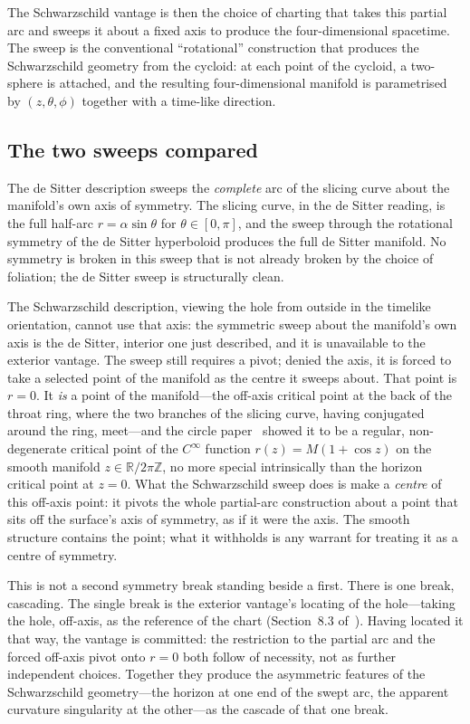\documentclass[11pt,a4paper]{article}
\theoremstyle{definition}
\begin{document}
The Schwarzschild vantage is then the choice of charting that takes this partial arc and sweeps it about a fixed axis to produce the four-dimensional spacetime. The sweep is the conventional ``rotational'' construction that produces the Schwarzschild geometry from the cycloid: at each point of the cycloid, a two-sphere is attached, and the resulting four-dimensional manifold is parametrised by $(z, \theta, \phi)$ together with a time-like direction.

\subsection{The two sweeps compared}\label{sec:two-sweeps}

The de Sitter description sweeps the \emph{complete} arc of the slicing curve about the manifold's own axis of symmetry. The slicing curve, in the de Sitter reading, is the full half-arc $r=\alpha\sin\theta$ for $\theta\in[0,\pi]$, and the sweep through the rotational symmetry of the de Sitter hyperboloid produces the full de Sitter manifold. No symmetry is broken in this sweep that is not already broken by the choice of foliation; the de Sitter sweep is structurally clean.

The Schwarzschild description, viewing the hole from outside in the timelike orientation, cannot use that axis: the symmetric sweep about the manifold's own axis is the de Sitter, interior one just described, and it is unavailable to the exterior vantage. The sweep still requires a pivot; denied the axis, it is forced to take a selected point of the manifold as the centre it sweeps about. That point is $r=0$. It \emph{is} a point of the manifold---the off-axis critical point at the back of the throat ring, where the two branches of the slicing curve, having conjugated around the ring, meet---and the circle paper~\cite{JanzenCircle} showed it to be a regular, non-degenerate critical point of the $C^{\infty}$ function $r(z)=M(1+\cos z)$ on the smooth manifold $z\in\mathbb{R}/2\pi\mathbb{Z}$, no more special intrinsically than the horizon critical point at $z=0$. What the Schwarzschild sweep does is make a \emph{centre} of this off-axis point: it pivots the whole partial-arc construction about a point that sits off the surface's axis of symmetry, as if it were the axis. The smooth structure contains the point; what it withholds is any warrant for treating it as a centre of symmetry.

This is not a second symmetry break standing beside a first. There is one break, cascading. The single break is the exterior vantage's locating of the hole---taking the hole, off-axis, as the reference of the chart (Section~8.3 of~\cite{JanzenSlicing}). Having located it that way, the vantage is committed: the restriction to the partial arc and the forced off-axis pivot onto $r=0$ both follow of necessity, not as further independent choices. Together they produce the asymmetric features of the Schwarzschild geometry---the horizon at one end of the swept arc, the apparent curvature singularity at the other---as the cascade of that one break.
\end{document}
